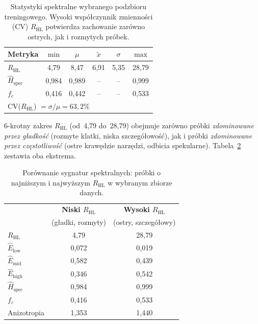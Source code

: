 \begin{table}[h]
\centering
\caption{Statystyki spektralne wybranego podzbioru treningowego.
         Wysoki współczynnik zmienności (CV) $R_{\text{HL}}$ potwierdza
         zachowanie zarówno ostrych, jak i rozmytych próbek.}
\label{tab:spectral_stats}
\begin{tabular}{lccccc}
\toprule
\textbf{Metryka} & $\min$ & $\mu$ & $\tilde{x}$ & $\sigma$ & $\max$ \\
\midrule
$R_{\text{HL}}$
    & 4{,}79 & 8{,}47 & 6{,}91 & 5{,}35 & 28{,}79 \\
$\hat{H}_{\text{spec}}$
    & 0{,}984 & 0{,}989 & -- & -- & 0{,}999 \\
$f_c$
    & 0{,}416 & 0{,}442 & -- & -- & 0{,}533 \\
\bottomrule
\multicolumn{6}{l}{\small CV($R_{\text{HL}}$) $= \sigma/\mu = 63{,}2\%$} \\
\end{tabular}
\end{table}

$6$-krotny zakres $R_{\text{HL}}$ (od~4{,}79 do~28{,}79) obejmuje zarówno
próbki \emph{zdominowane przez gładkość} (rozmyte klatki, niska
szczegółowość), jak i próbki \emph{zdominowane przez częstotliwość} (ostre
krawędzie narzędzi, odbicia spekularne).
Tabela~\ref{tab:spectral_extremes} zestawia oba ekstrema.

\begin{table}[h]
\centering
\caption{Porównanie sygnatur spektralnych: próbki o najniższym i najwyższym
         $R_{\text{HL}}$ w wybranym zbiorze danych.}
\label{tab:spectral_extremes}
\begin{tabular}{lcc}
\toprule
& \textbf{Niski $R_{\text{HL}}$} & \textbf{Wysoki $R_{\text{HL}}$} \\
& (gładki, rozmyty) & (ostry, szczegółowy) \\
\midrule
$R_{\text{HL}}$             & 4{,}79  & 28{,}79 \\
$\hat{E}_{\text{low}}$      & 0{,}072 & 0{,}019 \\
$\hat{E}_{\text{mid}}$      & 0{,}582 & 0{,}439 \\
$\hat{E}_{\text{high}}$     & 0{,}346 & 0{,}542 \\
$\hat{H}_{\text{spec}}$     & 0{,}984 & 0{,}999 \\
$f_c$                       & 0{,}416 & 0{,}533 \\
Anizotropia                 & 1{,}353 & 1{,}440 \\
\bottomrule
\end{tabular}
\end{table}


